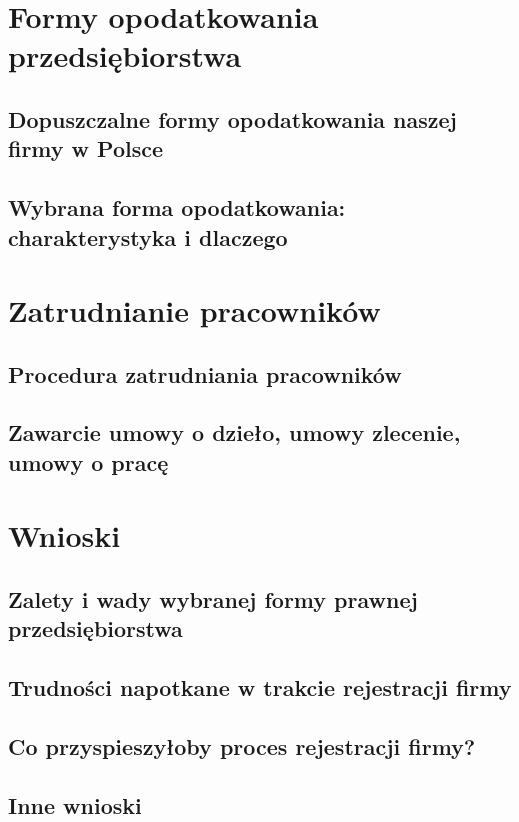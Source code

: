 \documentclass{sprawozdanie-agh}
\begin{document}
	\section{Formy opodatkowania przedsiębiorstwa}

		\subsection{Dopuszczalne formy opodatkowania naszej firmy w Polsce}
		\subsection{Wybrana forma opodatkowania: charakterystyka i dlaczego}

	\section{Zatrudnianie pracowników}

		\subsection{Procedura zatrudniania pracowników}
		\subsection{Zawarcie umowy o dzieło, umowy zlecenie, umowy o pracę}

	\section{Wnioski} 

		\subsection{Zalety i wady wybranej formy prawnej przedsiębiorstwa}
		\subsection{Trudności napotkane w trakcie rejestracji firmy}
		\subsection{Co przyspieszyłoby proces rejestracji firmy?}
		\subsection{Inne wnioski}
\end{document}
